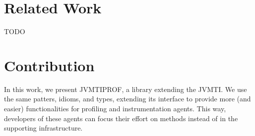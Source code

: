 
\section{Related Work}

TODO











\section{Contribution}

In this work, we present JVMTIPROF, a library extending the JVMTI. We use the same patters, idioms, and types, extending its interface to provide more (and easier) functionalities for profiling and instrumentation agents. This way, developers of these agents can focus their effort on methods instead of in the supporting infrastructure.



